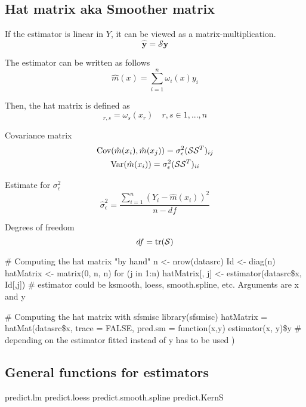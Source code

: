 \subsection{Hat matrix aka Smoother matrix}
\label{subsec:hatMatrix}
\begin{theory}
If the estimator is linear in $Y$, it can be viewed as a matrix-multiplication.
\begin{equation*}
 \hat{\mathbf{y}} = \mathcal{S}\mathbf{y}
\end{equation*}

The estimator can be written as follows
\begin{equation*}
 \hat{m}(x) = \sum_{i=1}^n \omega_i(x)y_i
\end{equation*}

Then, the hat matrix is defined as
\begin{equation*}
 [\mathcal{S}]_{r,s} = \omega_s(x_r)\quad r,s \in {1, ..., n}
\end{equation*}

Covariance matrix
\begin{subequations}
 \begin{gather*}
  \operatorname{Cov}(\hat{m}(x_i), \hat{m}(x_j)) = \sigma_\epsilon^2(\mathcal{S}\mathcal{S}^T)_{ij}\\
  \operatorname{Var}(\hat{m}(x_i)) = \sigma_\epsilon^2(\mathcal{S}\mathcal{S}^T)_{ii}
 \end{gather*}
\end{subequations}

Estimate for $\sigma_\epsilon^2$
\begin{equation*}
 \hat{\sigma}_\epsilon^2 = \frac{\sum_{i=1}^n (Y_i - \hat{m}(x_i))^2}{n - df}
\end{equation*}

Degrees of freedom
\begin{equation*}
 df = \operatorname{tr}(\mathcal{S})
\end{equation*}

\end{theory}

\begin{code}
 # Computing the hat matrix "by hand"
 n <- nrow(datasrc)
 Id <- diag(n)
 hatMatrix <- matrix(0, n, n)
 for (j in 1:n)
   hatMatrix[, j] <- estimator(datasrc\$x, Id[,j]) # estimator could be ksmooth, loess, smooth.spline, etc. Arguments are x and y

 # Computing the hat matrix with sfsmisc
 library(sfsmisc)
 hatMatrix = hatMat(datasrc\$x, trace = FALSE,
             pred.sm = function(x,y) estimator(x, y)\$y # depending on the estimator fitted instead of y has to be used
 )
\end{code}

\subsection{General functions for estimators}
\begin{code}
 predict.lm
 predict.loess
 predict.smooth.spline
 predict.KernS
\end{code}
